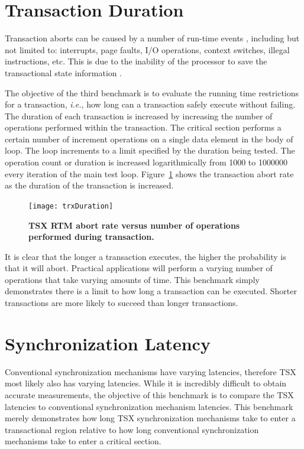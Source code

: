 \documentclass[11pt]{book}
\begin{document}
\section{Transaction Duration}

Transaction aborts can be caused by a number of run-time events \cite{intel_prog_ref},
including but not limited to: interrupts, page faults, I/O operations, context switches,
illegal instructions, etc.  This is due to the inability of the processor to save the
transactional state information \cite{schwahn}.

The objective of the third benchmark is to evaluate the running time restrictions for a
transaction, \emph{i.e.}, how long can a transaction safely execute without failing.  The
duration of each transaction is increased by increasing the number of operations performed
within the transaction. The critical section performs a certain number of increment
operations on a single data element in the body of loop.  The loop increments to a limit
specified by the duration being tested.  The operation count or duration is increased
logarithmically from 1000 to 1000000 every iteration of the main test loop.
Figure~\ref{fig:trx_duration} shows the transaction abort rate as the duration of the
transaction is increased.

\begin{figure}
    \centering
    \graphicspath{ {./figures/} }
    \texttt{[image: trxDuration]}
    \caption{\textbf{TSX RTM abort rate versus number of operations performed during
        transaction.}}\label{fig:trx_duration}
\end{figure}

It is clear that the longer a transaction executes, the higher the probability is that it
will abort.  Practical applications will perform a varying number of operations that take
varying amounts of time.  This benchmark simply demonstrates there is a limit to how long
a transaction can be executed.  Shorter transactions are more likely to succeed than
longer transactions.

\section{Synchronization Latency}

Conventional synchronization mechanisms have varying latencies, therefore TSX most likely
also has varying latencies.  While it is incredibly difficult to obtain accurate
measurements, the objective of this benchmark is to compare the TSX latencies to
conventional synchronization mechanism latencies.  This benchmark merely demonstrates how
long TSX synchronization mechanisms take to enter a transactional region relative to how
long conventional synchronization mechanisms take to enter a critical section.
\end{document}
